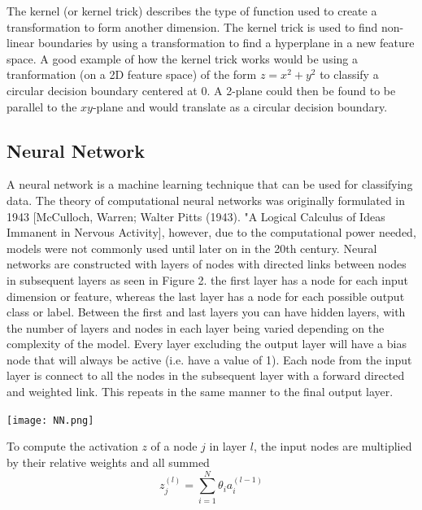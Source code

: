 \documentclass[a4paper,11pt,twoside]{article}
\begin{document}
The kernel (or kernel trick) describes the type of function used to create a transformation to form another dimension. The kernel trick is used to find non-linear boundaries by using a transformation to find a hyperplane in a new feature space. A good example of how the kernel trick works would be using a tranformation (on a 2D feature space) of the form $z=x^2+y^2$ to classify a circular decision boundary centered at 0. A 2-plane could then be found to be parallel to the $xy$-plane and would translate as a circular decision boundary.

\subsection{Neural Network}

A neural network is a machine learning technique that can be used for classifying data. The theory of computational neural networks was originally formulated in 1943 [McCulloch, Warren; Walter Pitts (1943). "A Logical Calculus of Ideas Immanent in Nervous Activity], however, due to the computational power needed, models were not commonly used until later on in the 20th century.  
\newline
\newline
Neural networks are constructed with layers of nodes with directed links between nodes in subsequent layers as seen in Figure 2. the first layer has a node for each input dimension or feature, whereas the last layer has a node for each possible output class or label. Between the first and last layers you can have hidden layers, with the number of layers and nodes in each layer being varied depending on the complexity of the model. Every layer excluding the output layer will have a bias node that will always be active (i.e. have a value of 1). Each node from the input layer is connect to all the nodes in the subsequent layer with a forward directed and weighted link. This repeats in the same manner to the final output layer. 

\begin{center}
\texttt{[image: NN.png]}

\end{center}

To compute the activation $z$ of a node $j$ in layer $l$, the input nodes are multiplied by their relative weights and all summed
\begin{equation}
z^{(l)}_j = \sum_{i=1}^N \theta_i a^{(l-1)}_i
\end{equation}
\end{document}
